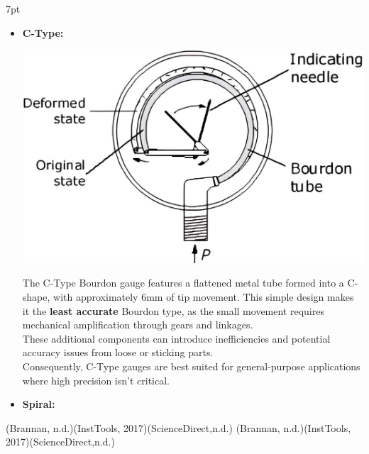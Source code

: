 \documentclass{article}
\newcommand{\formalsource}{} %
\newenvironment{formal}[3][]{%
	\renewcommand{\formalsource}{#1}%
	\def\FrameCommand{%
		\hspace{1pt}%
		{\color{#2}\vrule width 2pt}%
		{\color{#3}\vrule width 4pt}%
		\colorbox{#3}%
	}%
	\MakeFramed{\advance\hsize-\width\FrameRestore}%
	\noindent\hspace{-4.55pt}%
	\begin{adjustwidth}{}{7pt}%
		\vspace{2pt}%
	}%
	{%
		\vspace{4pt}%
		\ifx\formalsource\empty %
		\else
		\hfill{\footnotesize{\formalsource}}%
		\fi
	\end{adjustwidth}\endMakeFramed%
}
\begin{document}
\begin{formal}[(Brannan, n.d.)(InstTools, 2017)(ScienceDirect,n.d.)]{black!50!white}{white!97!gray}
\begin{itemize}
	\item \textbf{C-Type:}\\[8pt]
	\begin{minipage}{0.3\textwidth}\centering\hspace*{-1em}
		\includegraphics[width=1.1\textwidth]{images/ezgif-42a6b97cab4453(2)}
	\end{minipage}\hfill
	\begin{minipage}{0.6\textwidth}
		The C-Type Bourdon gauge features a flattened metal tube formed into a C-shape, with approximately 6mm of tip movement. This simple design makes it the \textbf{least accurate} Bourdon type, as the small movement requires mechanical amplification through gears and linkages.\\[5pt]
		These additional components can introduce inefficiencies and potential accuracy issues from loose or sticking parts.\\[5pt]
		Consequently, C-Type gauges are best suited for general-purpose applications where high precision isn't critical.
	\end{minipage}
   \item \textbf{Spiral:}\\[8pt]
	\begin{minipage}{0.3\textwidth}\centering

\end{minipage}
\end{itemize}
\end{formal}
\end{document}
